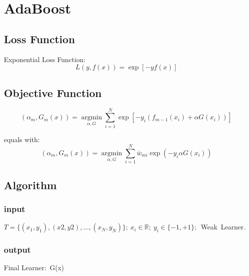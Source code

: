 ﻿\chapter{AdaBoost}

\section{Loss Function}
Exponential Loss Function:
\begin{equation}
L(y,f(x))=\exp[-yf(x)]
\end{equation}

\section{Objective Function}

\begin{equation}
(\alpha_m,G_m(x))= \underset{\alpha,G}{\operatorname{argmin}} \sum_{i=1}^N \exp{[-y_i(f_{m-1}(x_i)+\alpha G(x_i))]}
\end{equation}

equals with:
\begin{equation}
(\alpha_m,G_m(x))= \underset{\alpha,G}{\operatorname{argmin}} \sum_{i=1}^N {\bar{w}}_{mi} \exp{(-y_i \alpha G(x_i))}
\end{equation}

\section{Algorithm}
\subsection{input}
$T=\{(x_1,y_1),(x2,y2),\dotsc,(x_N,y_N) \};\ x_i\in \mathbb{R};\ y_i \in \{-1,+1\};$\ Weak\ Learner.
\subsection{output}
Final Learner:\ G(x)

